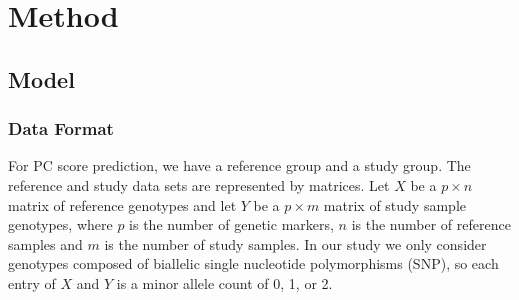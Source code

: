 \documentclass{article}
\begin{document}
\section{Method}

\subsection{Model}

\subsubsection{Data Format}
For PC score prediction,
we have a reference group and a study group.
The reference and study data sets are represented by matrices.
Let $X$ be a $p \times n$ matrix of reference genotypes
and  let $Y$ be a $p \times m$ matrix of study sample genotypes,
where $p$ is the number of genetic markers,
$n$ is the number of reference samples
and $m$ is the number of study samples.
In our study we only consider genotypes composed of biallelic single nucleotide polymorphisms (SNP),
so each entry of $X$ and $Y$ is a minor allele count of 0, 1, or 2.
\end{document}
